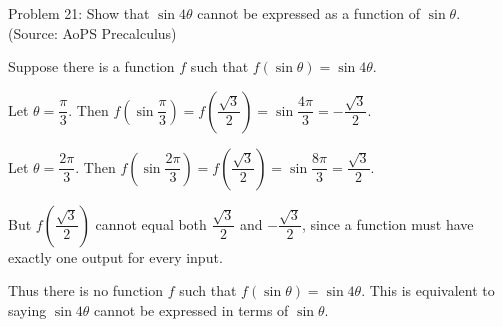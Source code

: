 Problem 21: Show that $\sin 4 \theta$ cannot be expressed as a function of $\sin \theta$. (Source: AoPS Precalculus)

Suppose there is a function $f$ such that $f(\sin \theta) = \sin 4\theta$.

Let $\theta = \dfrac{\pi}{3}$. Then $f\left(\sin \dfrac{\pi}{3}\right) = f\left(\dfrac{\sqrt 3}{2}\right) = \sin \dfrac{4\pi}{3} = -\dfrac{\sqrt 3}{2}$.

Let $\theta = \dfrac{2\pi}{3}$. Then $f\left(\sin \dfrac{2\pi}{3}\right) = f\left(\dfrac{\sqrt 3}{2}\right) = \sin \dfrac{8\pi}{3} = \dfrac{\sqrt 3}{2}$.

But $f\left(\dfrac{\sqrt 3}{2}\right)$ cannot equal both $\dfrac{\sqrt 3}{2}$ and $-\dfrac{\sqrt 3}{2}$, since a function must have exactly one output for every input.

Thus there is no function $f$ such that $f(\sin \theta) = \sin 4\theta$. This is equivalent to saying $\sin 4\theta$ cannot be expressed in terms of $\sin \theta$.
